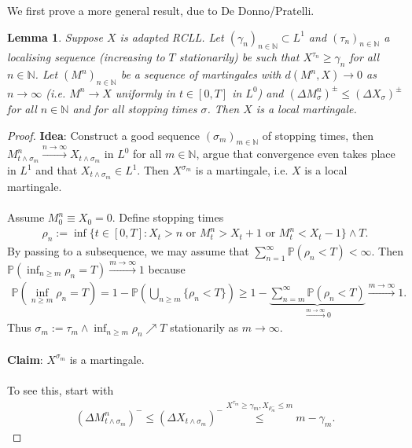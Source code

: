 \documentclass[12pt,a4paper, twoside]{article}
\newtheorem{lem}{Lemma}[section]
\theoremstyle{definition}
\newcommand{\PP}{\mathbb{P}} %
\begin{document}
We first prove a more general result, due to De Donno/Pratelli.
\begin{lem} \label{L42} Suppose $X$ is adapted RCLL. Let $( \gamma_n)_{n \in \mathbb{N}} \subset L^1$ and $( \tau_n)_{n \in \mathbb{N}}$ a localising sequence (increasing to $T$ stationarily) be such that $X^{\tau_n} \geq \gamma_n$ for all $n \in \mathbb{N}$. Let $(M^n)_{n \in \mathbb{N}}$ be a sequence of martingales with $d(M^n,X) \to 0$ as $n \to \infty$ (i.e. $M^n \to X$ uniformly in $t \in [0,T]$ in $L^0$) and $( \Delta M_\sigma^n)^\pm \leq ( \Delta X_\sigma)^\pm$ for all $n \in \mathbb{N}$ and for all stopping times $\sigma$. Then $X$ is a local martingale. 
\end{lem}
\newpage
\begin{proof}
\textbf{Idea}: Construct a good sequence $(\sigma_m)_{m \in \mathbb{N}}$ of stopping times, then $M_{t \wedge \sigma_m}^n \xrightarrow{n \to \infty} X_{t \wedge \sigma_m}$ in $L^0$ for all $m \in \mathbb{N}$, argue that convergence even takes place in $L^1$ and that $X_{t \wedge \sigma_m} \in L^1$. Then $X^{\sigma_m}$ is a martingale, i.e. $X$ is a local martingale. 
\\\\
Assume $M_0^n \equiv X_0 =0$. Define stopping times 
\begin{align*}
\rho_n := \inf \{ t \in [0,T]: X_t >n \text{ or } M_t^n > X_t+1 \text{ or } M_t^n < X_t-1 \} \wedge T.
\end{align*}
By passing to a subsequence, we may assume that $\sum_{n=1}^\infty \PP( \rho_n < T)  <\infty$. Then $\PP( \inf_{n \geq m} \rho_n =T) \xrightarrow{m \to \infty} 1$ because 
\begin{align*}
\PP( \inf_{n \geq m} \rho_n = T)= 1- \PP \left( \bigcup_{n \geq m } \{ \rho_n < T \} \right) \geq 1 - \underbrace{\sum_{n = m}^\infty \PP( \rho_n < T)}_{ \xrightarrow{m \to \infty}0 } \xrightarrow{m \to \infty} 1.
\end{align*}
Thus $\sigma_m := \tau_m \wedge \inf_{n \geq m} \rho_n \nearrow T$ stationarily as $m \to \infty$. 
\\\\
\textbf{Claim}: $X^{\sigma_m}$ is a martingale. 
\\\\
To see this, start with 
\begin{align*}
( \Delta M_{t \wedge \sigma_m}^n)^- \leq ( \Delta X_{t \wedge \sigma_m})^- \overset{X^{\tau_m} \geq \gamma_m, X_{\rho_m^-} \leq m } \leq m- \gamma_m.
\end{align*}

\end{proof}
\end{document}
